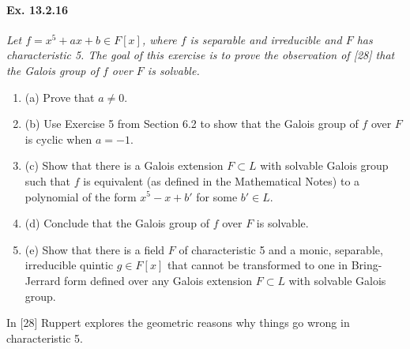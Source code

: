 \documentclass[11pt,a4paper]{article}
\newcommand{\be} {\begin{enumerate}}
\newcommand{\ee} {\end{enumerate}}
\begin{document}
\paragraph{Ex. 13.2.16}

{\it Let $f = x^5+ax+b \in F[x]$, where $f$ is separable and irreducible and $F$ has characteristic 5. The goal of this exercise is to prove the observation of [28] that the Galois group of $f$ over $F$ is solvable.
\be
\item[(a)] Prove that $a \ne 0$.
\item[(b)] Use Exercise 5 from Section 6.2 to show that the Galois group of $f$ over $F$ is cyclic when $a=-1$.
\item[(c)] Show that there is a Galois extension $F \subset L$ with solvable Galois group such that $f$ is equivalent (as defined in the Mathematical Notes) to a polynomial of the form $x^5 -x +b'$ for some $b' \in L$.
\item[(d)] Conclude that the Galois group of $f$ over $F$ is solvable.
\item[(e)] Show that there is a field $F$ of characteristic 5 and a monic, separable, irreducible quintic $g\in F[x]$ that cannot be transformed to one in Bring-Jerrard form defined over any Galois extension $F \subset L$ with solvable Galois group.
\ee
In [28] Ruppert explores the geometric reasons why things go wrong in characteristic 5.
}
\end{document}
